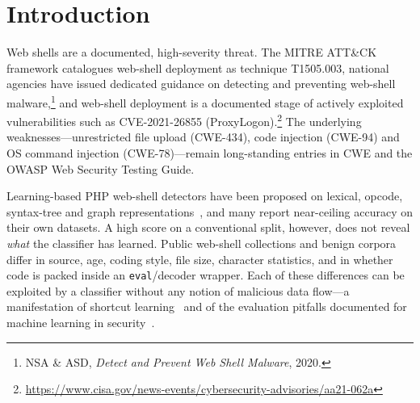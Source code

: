 \documentclass[pdflatex,sn-mathphys-num]{sn-jnl}
\begin{document}

\maketitle

\section{Introduction}\label{sec:intro}
Web shells are a documented, high-severity threat. The MITRE ATT\&CK framework
catalogues web-shell deployment as technique T1505.003, national agencies have
issued dedicated guidance on detecting and preventing web-shell
malware,\footnote{NSA \& ASD, \emph{Detect and Prevent Web Shell Malware}, 2020.}
and web-shell deployment is a documented stage of actively exploited
vulnerabilities such as CVE-2021-26855 (ProxyLogon).\footnote{\url{https://www.cisa.gov/news-events/cybersecurity-advisories/aa21-062a}}
The underlying weaknesses---unrestricted file upload (CWE-434), code injection
(CWE-94) and OS command injection (CWE-78)---remain long-standing entries in
CWE and the OWASP Web Security Testing Guide.

Learning-based PHP web-shell detectors have been proposed on lexical, opcode,
syntax-tree and graph representations~\cite{survey2024,astdf2024,glareshell2024},
and many report near-ceiling accuracy on their own datasets. A high score on a
conventional split, however, does not reveal \emph{what} the classifier has
learned. Public web-shell collections and benign corpora differ in source,
age, coding style, file size, character statistics, and in whether code is
packed inside an \texttt{eval}/decoder wrapper. Each of these differences can
be exploited by a classifier without any notion of malicious data flow---a
manifestation of shortcut learning~\cite{geirhos2020shortcut} and of the
evaluation pitfalls documented for machine learning in
security~\cite{arp2022dos,pendlebury2019tesseract}.
\end{document}
